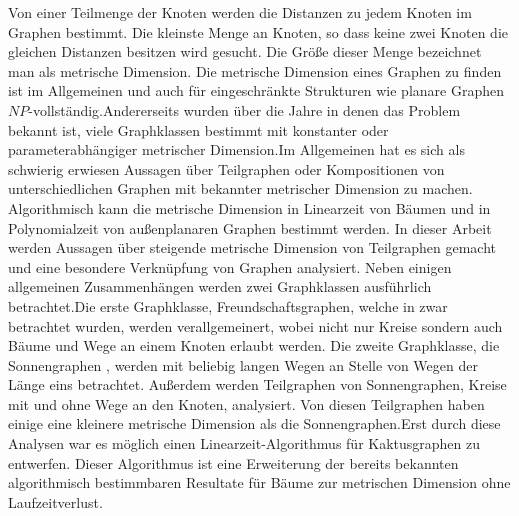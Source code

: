 Von einer Teilmenge der Knoten werden die Distanzen zu jedem Knoten im Graphen bestimmt. Die kleinste Menge an Knoten, so dass keine zwei Knoten die gleichen Distanzen besitzen wird gesucht. Die Größe dieser Menge bezeichnet man als metrische Dimension. Die metrische Dimension eines Graphen zu finden ist im Allgemeinen und auch für eingeschränkte Strukturen wie planare Graphen $NP$-vollständig.\newline\newline Andererseits wurden über die Jahre in denen das Problem bekannt ist, viele Graphklassen bestimmt mit konstanter oder parameterabhängiger metrischer Dimension.\newline\newline Im Allgemeinen hat es sich als schwierig erwiesen Aussagen über Teilgraphen oder Kompositionen von unterschiedlichen Graphen mit bekannter metrischer Dimension zu machen. Algorithmisch kann die metrische Dimension in Linearzeit von Bäumen und in Polynomialzeit von außenplanaren Graphen bestimmt werden.\newline\newline
In dieser Arbeit werden Aussagen über steigende metrische Dimension von Teilgraphen gemacht und eine besondere Verknüpfung von Graphen analysiert. Neben einigen allgemeinen Zusammenhängen werden zwei Graphklassen ausführlich betrachtet.\newline\newline Die erste Graphklasse, Freundschaftsgraphen, welche in \cite{amal} zwar betrachtet wurden, werden verallgemeinert, wobei nicht nur Kreise sondern auch Bäume und Wege an einem Knoten erlaubt werden. Die zweite Graphklasse, die Sonnengraphen \cite{sonnen}, werden mit beliebig langen Wegen an Stelle von Wegen der Länge eins betrachtet. Außerdem werden Teilgraphen von Sonnengraphen, Kreise mit und ohne Wege an den Knoten, analysiert. Von diesen Teilgraphen haben einige eine kleinere metrische Dimension als die Sonnengraphen.\newline\newline Erst durch diese Analysen war es möglich einen Linearzeit-Algorithmus für Kaktusgraphen zu entwerfen. Dieser Algorithmus ist eine Erweiterung der bereits bekannten algorithmisch bestimmbaren Resultate für Bäume zur metrischen Dimension ohne Laufzeitverlust.

